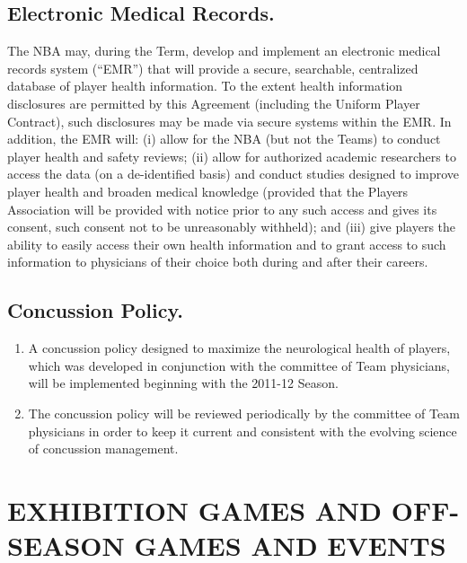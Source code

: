 \documentclass[
]{book}
\providecommand{\tightlist}{%
  \setlength{\itemsep}{0pt}\setlength{\parskip}{0pt}}
\begin{document}
\hypertarget{electronic-medical-records.}{%
\section{Electronic Medical Records.}\label{electronic-medical-records.}}

The NBA may, during the Term, develop and implement an electronic medical records system (``EMR'') that will provide a secure, searchable, centralized database of player health information. To the extent health information disclosures are permitted by this Agreement (including the Uniform Player Contract), such disclosures may be made via secure systems within the EMR. In addition, the EMR will: (i) allow for the NBA (but not the Teams) to conduct player health and safety reviews; (ii) allow for authorized academic researchers to access the data (on a de-identified basis) and conduct studies designed to improve player health and broaden medical knowledge (provided that the Players Association will be provided with notice prior to any such access and gives its consent, such consent not to be unreasonably withheld); and (iii) give players the ability to easily access their own health information and to grant access to such information to physicians of their choice both during and after their careers.

\hypertarget{concussion-policy.}{%
\section{Concussion Policy.}\label{concussion-policy.}}

\begin{enumerate}
\def\labelenumi{(\alph{enumi})}
\tightlist
\item
  A concussion policy designed to maximize the neurological health of players, which was developed in conjunction with the committee of Team physicians, will be implemented beginning with the 2011-12 Season.
\item
  The concussion policy will be reviewed periodically by the committee of Team physicians in order to keep it current and consistent with the evolving science of concussion management.
\end{enumerate}

\hypertarget{exhibition-games-and-off-season-games-and-events}{%
\chapter{EXHIBITION GAMES AND OFF-SEASON GAMES AND EVENTS}\label{exhibition-games-and-off-season-games-and-events}}
\end{document}
